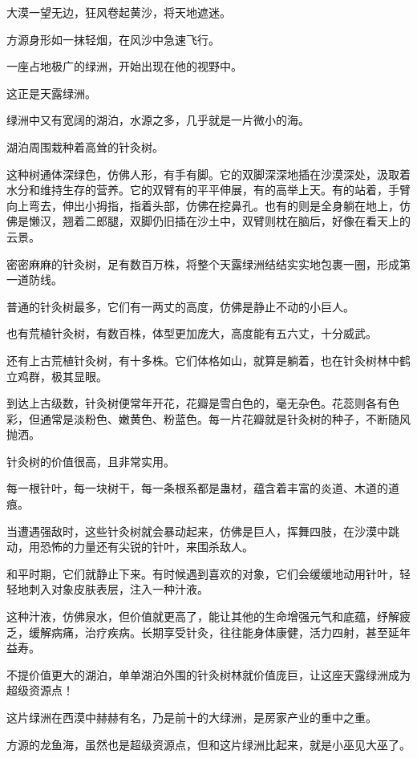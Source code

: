 
\begin{this_body}

大漠一望无边，狂风卷起黄沙，将天地遮迷。

方源身形如一抹轻烟，在风沙中急速飞行。

一座占地极广的绿洲，开始出现在他的视野中。

这正是天露绿洲。

绿洲中又有宽阔的湖泊，水源之多，几乎就是一片微小的海。

湖泊周围栽种着高耸的针灸树。

这种树通体深绿色，仿佛人形，有手有脚。它的双脚深深地插在沙漠深处，汲取着水分和维持生存的营养。它的双臂有的平平伸展，有的高举上天。有的站着，手臂向上弯去，伸出小拇指，指着头部，仿佛在挖鼻孔。也有的则是全身躺在地上，仿佛是懒汉，翘着二郎腿，双脚仍旧插在沙土中，双臂则枕在脑后，好像在看天上的云景。

密密麻麻的针灸树，足有数百万株，将整个天露绿洲结结实实地包裹一圈，形成第一道防线。

普通的针灸树最多，它们有一两丈的高度，仿佛是静止不动的小巨人。

也有荒植针灸树，有数百株，体型更加庞大，高度能有五六丈，十分威武。

还有上古荒植针灸树，有十多株。它们体格如山，就算是躺着，也在针灸树林中鹤立鸡群，极其显眼。

到达上古级数，针灸树便常年开花，花瓣是雪白色的，毫无杂色。花蕊则各有色彩，但通常是淡粉色、嫩黄色、粉蓝色。每一片花瓣就是针灸树的种子，不断随风抛洒。

针灸树的价值很高，且非常实用。

每一根针叶，每一块树干，每一条根系都是蛊材，蕴含着丰富的炎道、木道的道痕。

当遭遇强敌时，这些针灸树就会暴动起来，仿佛是巨人，挥舞四肢，在沙漠中跳动，用恐怖的力量还有尖锐的针叶，来围杀敌人。

和平时期，它们就静止下来。有时候遇到喜欢的对象，它们会缓缓地动用针叶，轻轻地刺入对象皮肤表层，注入一种汁液。

这种汁液，仿佛泉水，但价值就更高了，能让其他的生命增强元气和底蕴，纾解疲乏，缓解病痛，治疗疾病。长期享受针灸，往往能身体康健，活力四射，甚至延年益寿。

不提价值更大的湖泊，单单湖泊外围的针灸树林就价值庞巨，让这座天露绿洲成为超级资源点！

这片绿洲在西漠中赫赫有名，乃是前十的大绿洲，是房家产业的重中之重。

方源的龙鱼海，虽然也是超级资源点，但和这片绿洲比起来，就是小巫见大巫了。


\end{this_body}
